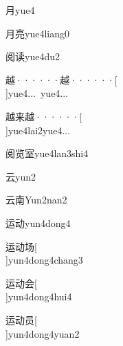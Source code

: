 \begin{verbete}[4]{月}{yue4}
\end{verbete}

\begin{verbete}[4;9]{月亮}{yue4liang0}
\end{verbete}

\begin{verbete}[10;10]{阅读}{yue4du2}
\end{verbete}

\begin{verbete}[12;12]{越······越······}[\\]{yue4...\ yue4...}
\end{verbete}

\begin{verbete}[12;7;12]{越来越······}[\\]{yue4lai2yue4...}
\end{verbete}

\begin{verbete}[10;9;9]{阅览室}{yue4lan3shi4}
\end{verbete}

\begin{verbete}[4]{云}{yun2}
\end{verbete}

\begin{verbete}[4;9]{云南}{Yun2nan2}
\end{verbete}

\begin{verbete}[7;6]{运动}{yun4dong4}
\end{verbete}

\begin{verbete}[7;6;6]{运动场}[\\]{yun4dong4chang3}
\end{verbete}

\begin{verbete}[7;6;6]{运动会}[\\]{yun4dong4hui4}
\end{verbete}

\begin{verbete}[7;6;7]{运动员}[\\]{yun4dong4yuan2}
\end{verbete}


